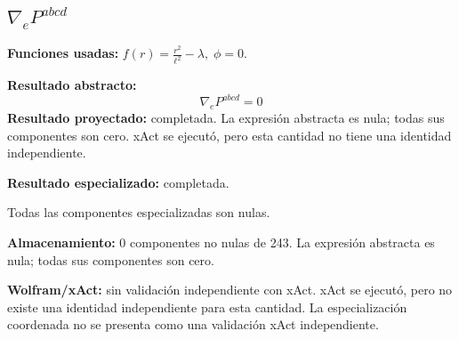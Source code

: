 \documentclass[11pt]{article}
\begin{document}
\subsection*{$ \nabla_e P^{abcd} $}
\textbf{Funciones usadas:} $ f\!\left(r\right) = \frac{{r}^{2}}{{\ell}^{2}} - \lambda,\;\phi=0 $.\par
\textbf{Resultado abstracto:}
\begin{dmath*}[breakdepth={5}]
\nabla_e P^{abcd} = 0
\end{dmath*}
\textbf{Resultado proyectado:} completada. La expresión abstracta es nula; todas sus componentes son cero. xAct se ejecutó, pero esta cantidad no tiene una identidad independiente.\par
\textbf{Resultado especializado:} completada.\par
Todas las componentes especializadas son nulas.\par
\textbf{Almacenamiento:} 0 componentes no nulas de 243. La expresión abstracta es nula; todas sus componentes son cero.\par
\textbf{Wolfram/xAct:} sin validación independiente con xAct. xAct se ejecutó, pero no existe una identidad independiente para esta cantidad. La especialización coordenada no se presenta como una validación xAct independiente.\par\medskip
{}
\end{document}

